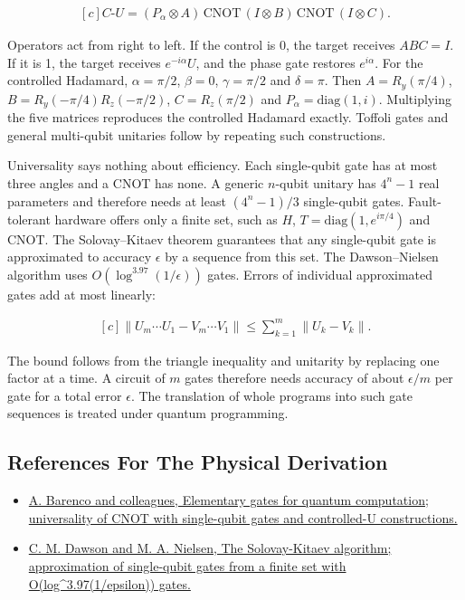 \documentclass[11pt,oneside]{book}
\newenvironment{centeredalign}{\[\begin{gathered}[c]}{\end{gathered}\]}
\begin{document}
\begin{centeredalign}
C\text{-}U=(P_\alpha\otimes A)\,\mathrm{CNOT}\,(I\otimes B)\,\mathrm{CNOT}\,(I\otimes C).
\end{centeredalign}

Operators act from right to left. If the control is 0, the target receives \(ABC=I\). If it is 1, the target receives \(e^{-i\alpha}U\), and the phase gate restores \(e^{i\alpha}\). For the controlled Hadamard, \(\alpha=\pi/2\), \(\beta=0\), \(\gamma=\pi/2\) and \(\delta=\pi\). Then \(A=R_y(\pi/4)\), \(B=R_y(-\pi/4)R_z(-\pi/2)\), \(C=R_z(\pi/2)\) and \(P_\alpha=\mathrm{diag}(1,i)\). Multiplying the five matrices reproduces the controlled Hadamard exactly. Toffoli gates and general multi-qubit unitaries follow by repeating such constructions.

Universality says nothing about efficiency. Each single-qubit gate has at most three angles and a CNOT has none. A generic \(n\)-qubit unitary has \(4^n-1\) real parameters and therefore needs at least \((4^n-1)/3\) single-qubit gates. Fault-tolerant hardware offers only a finite set, such as \(H\), \(T=\mathrm{diag}(1,e^{i\pi/4})\) and CNOT. The Solovay--Kitaev theorem guarantees that any single-qubit gate is approximated to accuracy \(\epsilon\) by a sequence from this set. The Dawson--Nielsen algorithm uses \(O(\log^{3.97}(1/\epsilon))\) gates. Errors of individual approximated gates add at most linearly:

\begin{centeredalign}
\|U_m\cdots U_1-V_m\cdots V_1\|\leq\sum_{k=1}^{m}\|U_k-V_k\|.
\end{centeredalign}

The bound follows from the triangle inequality and unitarity by replacing one factor at a time. A circuit of \(m\) gates therefore needs accuracy of about \(\epsilon/m\) per gate for a total error \(\epsilon\). The translation of whole programs into such gate sequences is treated under quantum programming.

\subsection*{References For The Physical Derivation}
\begin{itemize}
\item \href{https://arxiv.org/abs/quant-ph/9503016}{A. Barenco and colleagues, Elementary gates for quantum computation; universality of CNOT with single-qubit gates and controlled-U constructions.}
\item \href{https://arxiv.org/abs/quant-ph/0505030}{C. M. Dawson and M. A. Nielsen, The Solovay-Kitaev algorithm; approximation of single-qubit gates from a finite set with O(log\textasciicircum{}3.97(1/epsilon)) gates.}
\end{itemize}
\end{document}
